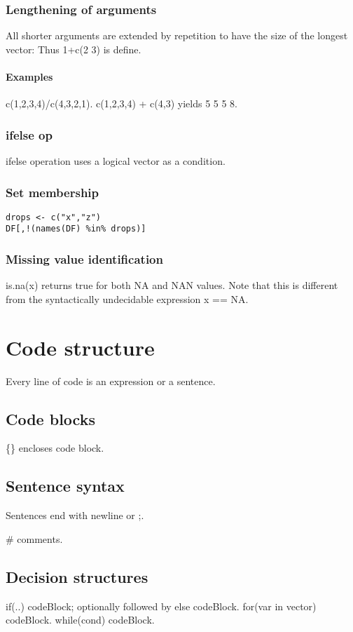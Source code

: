 \subsubsection{Lengthening of arguments}
All shorter arguments are extended by repetition to have the size of the longest vector: Thus 1+c(2 3) is define.

\paragraph{Examples}
c(1,2,3,4)/c(4,3,2,1). c(1,2,3,4) + c(4,3) yields 5 5 5 8.

\subsubsection{ifelse op}
ifelse operation uses a logical vector as a condition.

\subsubsection{Set membership}
\begin{verbatim}
drops <- c("x","z")
DF[,!(names(DF) %in% drops)]
\end{verbatim}


\subsubsection{Missing value identification}
is.na(x) returns true for both NA and NAN values. Note that this is different from the syntactically undecidable expression x == NA.



\section{Code structure}
Every line of code is an expression or a sentence.

\subsection{Code blocks}
\{\} encloses code block.

\subsection{Sentence syntax}
Sentences end with newline or ;.

\# comments.

\subsection{Decision structures}
if(..) codeBlock; optionally followed by else codeBlock. for(var in vector) codeBlock. while(cond) codeBlock.

